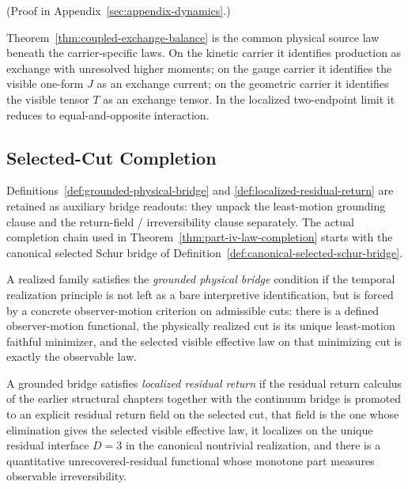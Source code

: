 (Proof in Appendix~\ref{sec:appendix-dynamics}.)

\begin{remark}
\label{rem:what-coupled-exchange-collapses}
Theorem~\ref{thm:coupled-exchange-balance} is the common physical source law
beneath the carrier-specific laws. On the kinetic carrier it identifies
production as exchange with unresolved higher moments; on the gauge carrier it
identifies the visible one-form \(J\) as an exchange current; on the geometric
carrier it identifies the visible tensor \(T\) as an exchange tensor. In the
localized two-endpoint limit it reduces to equal-and-opposite interaction.
\end{remark}

\subsection{Selected-Cut Completion}

Definitions~\ref{def:grounded-physical-bridge} and
\ref{def:localized-residual-return} are retained as auxiliary bridge readouts:
they unpack the least-motion grounding clause and the return-field /
irreversibility clause separately. The actual completion chain used in
Theorem~\ref{thm:part-iv-law-completion} starts with the canonical selected
Schur bridge of Definition~\ref{def:canonical-selected-schur-bridge}.

\begin{definition}
\label{def:grounded-physical-bridge}
A realized family satisfies the \emph{grounded physical bridge} condition if
the temporal realization principle is not left as a bare interpretive
identification, but is forced by a concrete observer-motion criterion on
admissible cuts: there is a defined observer-motion functional, the physically
realized cut is its unique least-motion faithful minimizer, and the selected
visible effective law on that minimizing cut is exactly the observable law.
\end{definition}

\begin{definition}
\label{def:localized-residual-return}
A grounded bridge satisfies \emph{localized residual return} if the residual
return calculus of the earlier structural chapters together with the continuum
bridge is promoted to an explicit residual return
field on the selected cut, that field is the one whose elimination gives the
selected visible effective law, it localizes on the unique residual interface
\(D=3\) in the canonical nontrivial realization, and there is a quantitative
unrecovered-residual functional whose monotone part measures observable
irreversibility.
\end{definition}

